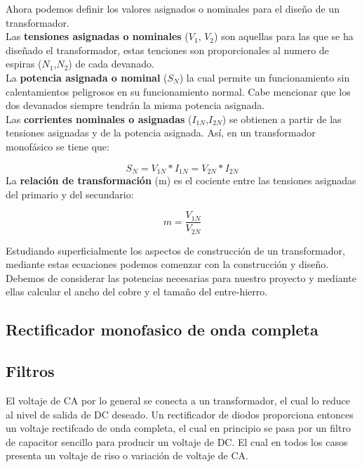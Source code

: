 Ahora podemos definir los valores asignados o nominales para el diseño de un transformador.\\

Las \textbf{tensiones asignadas o nominales} ($V_{1}$, $V_{2}$) son aquellas para las que se ha diseñado el transformador, estas tenciones son proporcionales al numero de espiras ($N_{1}$,$N_{2}$) de cada devanado.\\

La \textbf{potencia asignada o nominal} ($S_{N}$) la cual permite un funcionamiento sin calentamientos peligrosos en su funcionamiento normal. Cabe mencionar que los dos devanados siempre tendrán la misma potencia asignada.\\

Las \textbf{corrientes nominales o asignadas} ($I_{1N}$,$I_{2N}$) se obtienen a partir de las tensiones asignadas y de la potencia asignada. Así, en un transformador monofásico se tiene que:

\begin{equation}\label{eq:ej}
S_{N}=V_{1N}*I_{1N}=V_{2N}*I_{2N}
\end{equation}
La \textbf{relación de transformación} (m) es el cociente entre las tensiones asignadas del primario y del secundario: 

\begin{equation}\label{eq:ej}
m=\dfrac{V_{1N}}{V_{2N}}
\end{equation}

Estudiando superficialmente los aspectos de construcción de un transformador, mediante estas ecuaciones podemos comenzar con la construcción y diseño. Debemos de considerar las potencias necesarias para nuestro proyecto y mediante ellas calcular el ancho del cobre y el tamaño del entre-hierro.

\subsection{Rectificador monofasico de onda completa}
\subsection{Filtros}
El voltaje de CA por lo general se conecta a un transformador, el cual lo reduce al nivel de salida de DC deseado. Un rectificador de diodos proporciona entonces un voltaje rectifcado de onda completa, el cual en principio se pasa por un filtro de capacitor sencillo para producir un voltaje de DC. El cual en todos los casos presenta un voltaje de riso o variación de voltaje de CA.\\

